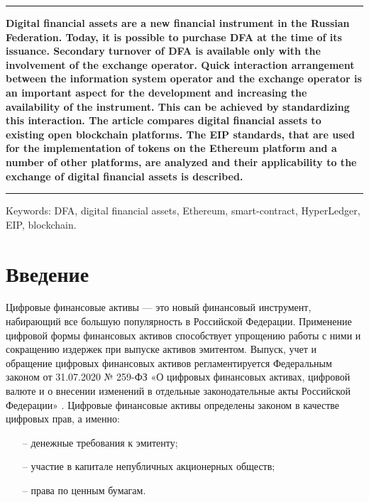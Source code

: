 \documentclass[a4paper, 10pt]{article}
\begin{document}
	\leftskip 0cm
	
	\vspace{3pt}
	\hrule height 2pt
	\vspace{3pt}
	
	\noindent \textbf{Digital financial assets are a new financial instrument in the Russian Federation. Today, it is possible to purchase DFA at the time of its issuance. Secondary turnover of DFA is available only with the involvement of the exchange operator. Quick interaction arrangement between the information system operator and the exchange operator is an important aspect for the development and increasing the availability of the instrument. This can be achieved by standardizing this interaction. The article compares digital financial assets to existing open blockchain platforms. The EIP standards, that are used for the implementation of tokens on the Ethereum platform and a number of other platforms, are analyzed and their applicability to the exchange of digital financial assets is described.}
	
	\vspace{3pt}
	\hrule height 2pt
	\vspace{6pt}
	
	\noindent Keywords: DFA, digital financial assets, Ethereum, smart-contract, HyperLedger, EIP, blockchain.
	
	
	\section*{Введение}
	
	Цифровые финансовые активы — это новый финансовый инструмент, набирающий все большую популярность в Российской Федерации. Применение цифровой формы финансовых активов способствует упрощению работы с ними и сокращению издержек при выпуске активов эмитентом. Выпуск, учет и обращение цифровых финансовых активов регламентируется Федеральным законом от 31.07.2020 № 259-ФЗ «О цифровых финансовых активах, цифровой валюте и о внесении изменений в отдельные законодательные акты Российской Федерации» \cite{ru:fz-259}. Цифровые финансовые активы определены законом в качестве цифровых прав, а именно:
	\begin{itemize}
		\itemsep0em
		\item[--] денежные требования к эмитенту;
		\item[--] участие в капитале непубличных акционерных обществ;
		\item[--] права по ценным бумагам.
	\end{itemize}
	
\end{document}
